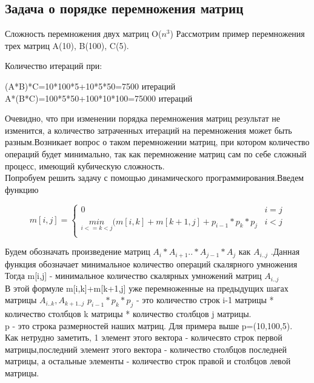     \subsection{Задача о порядке перемножения матриц}
    Сложность перемножения двух матриц O($n^3$)
    Рассмотрим пример перемножения трех матриц A(10), B(100), C(5).
    
    Количество итераций при:\\
    \begin{center}
        (A*B)*C=10*100*5+10*5*50=7500 итераций\\
        A*(B*C)=100*5*50+100*10*100=75000 итераций \\
    \end{center}
    Очевидно, что при изменении порядка перемножения матриц результат не изменится, а количество затраченных итераций на перемножения может быть разным.Возникает вопрос о таком перемножении матриц, при котором количество операций будет минимально, так как перемножение матриц сам по себе сложный процесс, имеющий кубическую сложность.\\
    Попробуем решить задачу с помощью динамического программирования.Введем функцию
     \begin{center}
        \begin{equation*}
        m[i,j] =
        \begin{cases}
         0 & i=j\\
         \underset{i<=k<j}{min}(m[i,k]+m[k+1,j]+p_{i-1}*p_{k}*p_{j} & i<j \\
        \end{cases}
    \end{equation*}
    \end{center}
    Будем обозначать произведение матриц $A_{i}*A_{i+1}..*A_{j-1}*A_{j}$ как $A_{i..j}$ .Данная функция обозначает минимальное количество операций скалярного умножения \\
    Тогда m[i,j] - минимальное количество скалярных умножений матриц $A_{i..j}$\\
    В этой формуле m[i,k]+m[k+1,j] уже перемноженные на предыдущих шагах матрицы $A_{i..k}, A_{k+1..j}$ 
    $p_{i-1}*p_{k}*p_{j}$ - это количество строк i-1 матрицы * количество столбцов k матрицы * количество столбцов j матрицы.\\
    p - это строка размерностей наших матриц. Для примера выше p=(10,100,5).\\
    Как нетрудно заметить, 1 элемент этого вектора - количесвто строк первой матрицы,последний элемент этого вектора - количество столбцов последней матрицы, а остальные элементы - количество строк правой и столбцов левой матрицы.
    
